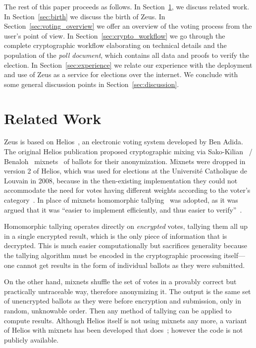 \documentclass[letterpaper,10pt]{article}
\begin{document}
The rest of this paper proceeds as follows. In
Section~\ref{sec:related}, we discuss related work. In
Section~\ref{sec:birth} we discuss the birth of Zeus. In
Section~\ref{sec:voting_overview} we offer an overview of the voting
process from the user's point of view. In
Section~\ref{sec:crypto_workflow} we go through the complete
cryptographic workflow elaborating on technical details and the
population of the \emph{poll document}, which contains all data and
proofs to verify the election. In Section~\ref{sec:experience} we
relate our experience with the deployment and use of Zeus as a service
for elections over the internet. We conclude with some general
discussion points in Section~\ref{sec:discussion}.

\section{Related Work}
\label{sec:related}

Zeus is based on Helios~\cite{adida:2008}, an electronic voting system
developed by Ben Adida. The original Helios publication
\cite{adida:2008} proposed cryptographic mixing via
Sako-Kilian~\cite{sako:1995} / Benaloh~\cite{benaloh:2006}
mixnets~\cite{sako:1995} of ballots for their anonymization. Mixnets
were dropped in version 2 of Helios, which was used for elections at
the Universit\'{e} Catholique de Louvain in 2008, because in the
then-existing implementation they could not accommodate the need for
votes having different weights according to the voter's
category~\cite{adida:2009}. In place of mixnets homomorphic
tallying~\cite{cohen:1985} was adopted, as it was argued that it was
``easier to implement efficiently, and thus easier to
verify''~\cite{adida:2009}.

Homomorphic tallying operates directly on \emph{encrypted} votes,
tallying them all up in a single encrypted result, which is the only
piece of information that is decrypted. This is much easier
computationally but sacrifices generality because the tallying
algorithm must be encoded in the cryptographic processing itself---one
cannot get results in the form of individual ballots as they were
submitted.

On the other hand, mixnets shuffle the set of votes in a provably
correct but practically untraceable way, therefore anonymizing it. The
output is the same set of unencrypted ballots as they were before
encryption and submission, only in random, unknowable order. Then any
method of tallying can be applied to compute results. Although Helios
itself is not using mixnets any more, a variant of Helios with mixnets
has been developed that does~\cite{bulens:2011}; however the code is
not publicly available. 
\end{document}
